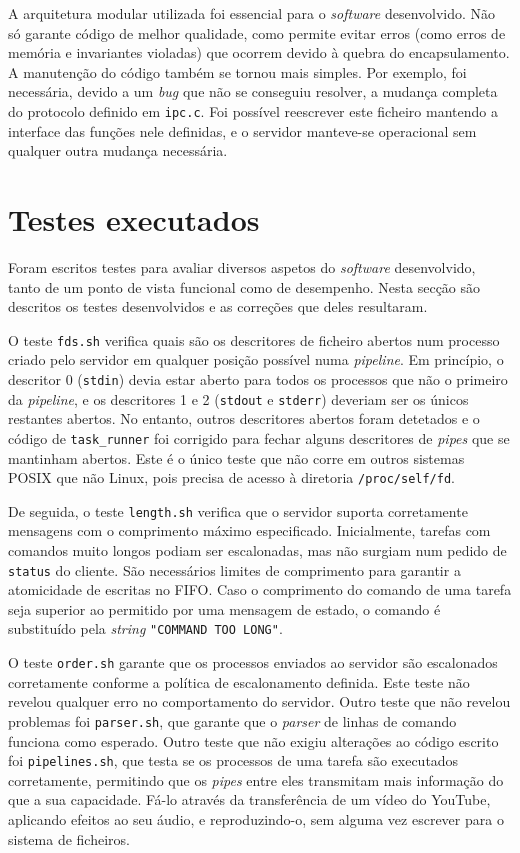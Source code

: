 \documentclass[11pt]{article}
\begin{document}
A arquitetura modular utilizada foi essencial para o \emph{software} desenvolvido. Não só garante
código de melhor qualidade, como permite evitar erros (como erros de memória e invariantes violadas)
que ocorrem devido à quebra do encapsulamento. A manutenção do código também se tornou mais simples.
Por exemplo, foi necessária, devido a um \emph{bug} que não se conseguiu resolver, a mudança
completa do protocolo definido em \texttt{ipc.c}. Foi possível reescrever este ficheiro mantendo a
interface das funções nele definidas, e o servidor manteve-se operacional sem qualquer outra mudança
necessária.

\section{Testes executados}

Foram escritos testes para avaliar diversos aspetos do \emph{software} desenvolvido, tanto de um
ponto de vista funcional como de desempenho. Nesta secção são descritos os testes desenvolvidos e
as correções que deles resultaram.

O teste \texttt{fds.sh} verifica quais são os descritores de ficheiro abertos num processo criado
pelo servidor em qualquer posição possível numa \emph{pipeline}. Em princípio, o descritor 0
(\texttt{stdin}) devia estar aberto para todos os processos que não o primeiro da \emph{pipeline}, e
os descritores 1 e 2 (\texttt{stdout} e \texttt{stderr}) deveriam ser os únicos restantes abertos.
No entanto, outros descritores abertos foram detetados e o código de \texttt{task\_runner} foi
corrigido para fechar alguns descritores de \emph{pipes} que se mantinham abertos. Este é o único
teste que não corre em outros sistemas POSIX que não Linux, pois precisa de acesso à diretoria
\texttt{/proc/self/fd}.

De seguida, o teste \texttt{length.sh} verifica que o servidor suporta corretamente mensagens com o
comprimento máximo especificado. Inicialmente, tarefas com comandos muito longos podiam ser
escalonadas, mas não surgiam num pedido de \texttt{status} do cliente. São necessários limites de
comprimento para garantir a atomicidade de escritas no FIFO. Caso o comprimento do comando de uma
tarefa seja superior ao permitido por uma mensagem de estado, o comando é substituído pela
\emph{string} \texttt{"COMMAND TOO LONG"}.

O teste \texttt{order.sh} garante que os processos enviados ao servidor são escalonados corretamente
conforme a política de escalonamento definida. Este teste não revelou qualquer erro no comportamento
do servidor. Outro teste que não revelou problemas foi \texttt{parser.sh}, que garante que o
\emph{parser} de linhas de comando funciona como esperado. Outro teste que não exigiu alterações ao
código escrito foi \texttt{pipelines.sh}, que testa se os processos de uma tarefa são executados
corretamente, permitindo que os \emph{pipes} entre eles transmitam mais informação do que a sua
capacidade. Fá-lo através da transferência de um vídeo do YouTube, aplicando efeitos ao seu áudio, e
reproduzindo-o, sem alguma vez escrever para o sistema de ficheiros.
\end{document}
